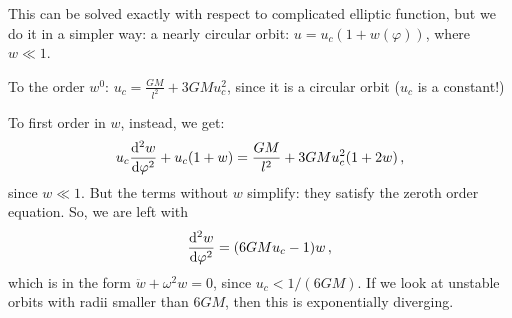 \documentclass[main.tex]{subfiles}
\begin{document}
This can be solved exactly with respect to complicated elliptic function, but we do it in a simpler way: a nearly circular orbit: \(u = u_c (1+w(\varphi ))\), where \(w \ll 1\).

To the order \(w^{0}\): \(u_c = \frac{GM}{l^2} + 3GM u_c^{2}\), since it is a circular orbit (\(u_c\) is a constant!)

To first order in \(w\), instead, we get: 
%
\begin{align}
  u_c \dv[2]{w}{\varphi } + u_c(1+w) = \frac{GM}{l^2} + 3GMu_c^2 (1+2w)
\,,
\end{align}
%
since \(w \ll 1\). But the terms without \(w\) simplify: they satisfy the zeroth order equation. So, we are left with 
%
\begin{align}
  \dv[2]{w}{\varphi }  = (6GMu_c-1) w
\,,
\end{align}
%
which is in the form \(\ddot{w} + \omega^2 w =0\), since \(u_c < 1/(6GM)\). If we look at unstable orbits with radii smaller than \(6GM\), then this is exponentially diverging.
\end{document}
